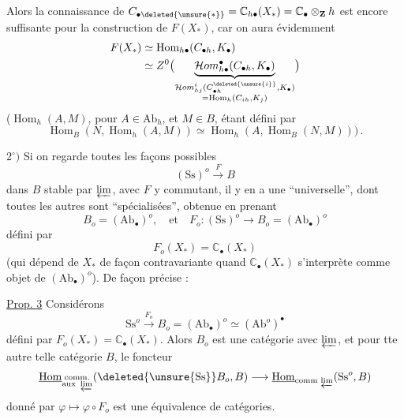 Alors la connaissance de $C_{\bullet\deleted{\unsure{*}}}=\mathbb C_{h\bullet}(X_*)
=\mathbb C_\bullet\otimes_{\mathbf Z}h$ est encore suffisante pour
la construction de $F(X_*)$, car on aura
évidemment
\[
\begin{aligned}
F(X_*)&\simeq\operatorname{Hom}_{h\bullet}(C_{\bullet h},K_\bullet)\\
&\simeq Z^0\bigl(\underbrace{\mathcal Hom^{\bullet}_{h\bullet}(C_{\bullet h},K_\bullet)}_{
\substack{\mathcal Hom^i_{hj}(C_{\bullet h}^{\deleted{\unsure{i}}},K_\bullet)\\
=\operatorname{Hom}_h(C_{ih},K_j)}}\bigr)
\end{aligned}
\]
($\operatorname{Hom}_h(A,M)$, pour $A\in\mathrm{Ab}_h$, et $M\in B$, étant
défini par
\[
\operatorname{Hom}_B(N,\operatorname{Hom}_h(A,M))\simeq
\operatorname{Hom}_h(A,\operatorname{Hom}_B(N,M)))\,.
\]

$2^\circ)$ Si on regarde toutes les façons possibles
\[
(\mathrm{Ss})^o\xrightarrow{F}B
\]
dans $B$ stable par $\varprojlim$, avec $F$ y
commutant, il y en a  une
``universelle'', dont toutes les autres sont
``spécialisées'', obtenue en prenant
\[
B_o=(\mathrm{Ab}_\bullet)^o,\quad\text{et}\quad
F_o:(\mathrm{Ss})^o\longrightarrow B_o=(\mathrm{Ab}_\bullet)^o
\]
défini par
\[
F_o(X_*)=\mathbb C_\bullet(X_*)
\]
(qui dépend de $X_*$ de façon contravariante
quand $\mathbb C_\bullet(X_*)$ s'interprète comme
objet de $(\mathrm{Ab}_\bullet)^o$). De façon précise :

\uline{Prop. 3} Considérons
\[
\mathrm{Ss}^o\xrightarrow{F_o}B_o=(\mathrm{Ab}_\bullet)^o\simeq(\mathrm{Ab}^o)^\bullet
\]
défini par $F_o(X_*)=\mathbb C_\bullet(X_*)$. Alors
$B_o$ est une catégorie  avec $\varprojlim$, et
pour tte autre telle catégorie $B$,
le foncteur
\[
\underline{\operatorname{Hom}}_{\substack{\mathrm{comm.}\\\text{aux }\varprojlim}}
(\deleted{\unsure{\mathrm{Ss}}}B_o,B)\longrightarrow
\underline{\operatorname{Hom}}_{\mathrm{comm}\,\varprojlim}(\mathrm{Ss}^o,B)
\]
donné par $\varphi\longmapsto\varphi\circ F_o$
est une équivalence de catégories.

